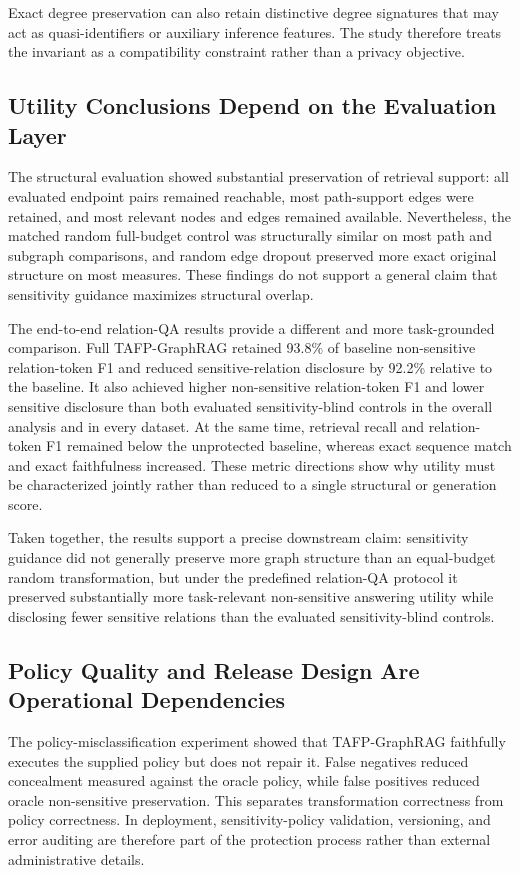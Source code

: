 \documentclass[preprint,12pt]{elsarticle}
\begin{document}
Exact degree preservation can also retain distinctive degree signatures that may act as quasi-identifiers or auxiliary inference features. The study therefore treats the invariant as a compatibility constraint rather than a privacy objective.

\subsection{Utility Conclusions Depend on the Evaluation Layer}
The structural evaluation showed substantial preservation of retrieval support: all evaluated endpoint pairs remained reachable, most path-support edges were retained, and most relevant nodes and edges remained available. Nevertheless, the matched random full-budget control was structurally similar on most path and subgraph comparisons, and random edge dropout preserved more exact original structure on most measures. These findings do not support a general claim that sensitivity guidance maximizes structural overlap.

The end-to-end relation-QA results provide a different and more task-grounded comparison. Full TAFP-GraphRAG retained 93.8\% of baseline non-sensitive relation-token F1 and reduced sensitive-relation disclosure by 92.2\% relative to the baseline. It also achieved higher non-sensitive relation-token F1 and lower sensitive disclosure than both evaluated sensitivity-blind controls in the overall analysis and in every dataset. At the same time, retrieval recall and relation-token F1 remained below the unprotected baseline, whereas exact sequence match and exact faithfulness increased. These metric directions show why utility must be characterized jointly rather than reduced to a single structural or generation score.

Taken together, the results support a precise downstream claim: sensitivity guidance did not generally preserve more graph structure than an equal-budget random transformation, but under the predefined relation-QA protocol it preserved substantially more task-relevant non-sensitive answering utility while disclosing fewer sensitive relations than the evaluated sensitivity-blind controls.

\subsection{Policy Quality and Release Design Are Operational Dependencies}
The policy-misclassification experiment showed that TAFP-GraphRAG faithfully executes the supplied policy but does not repair it. False negatives reduced concealment measured against the oracle policy, while false positives reduced oracle non-sensitive preservation. This separates transformation correctness from policy correctness. In deployment, sensitivity-policy validation, versioning, and error auditing are therefore part of the protection process rather than external administrative details.
\end{document}
